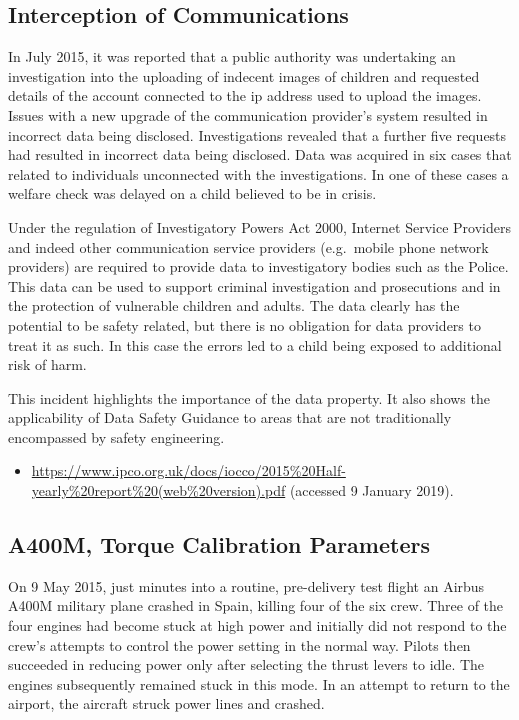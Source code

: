\subsection{Interception of Communications} \label{bkm:incacc:comintercept}
In July 2015, it was reported that a public authority was undertaking an investigation into the uploading of indecent images of children and requested details of the account connected to the \gls{ip} address used to upload the images. Issues with a new upgrade of the communication provider's system resulted in incorrect data being disclosed. Investigations revealed that a further five requests had resulted in incorrect data being disclosed. Data was acquired in six cases that related to individuals unconnected with the investigations. In one of these cases a welfare check was delayed on a child believed to be in crisis.

Under the regulation of Investigatory Powers Act 2000, Internet Service Providers and indeed other communication service providers (e.g.\ mobile phone network providers) are required to provide data to investigatory bodies such as the Police. This data can be used to support criminal investigation and prosecutions and in the protection of vulnerable children and adults. The data clearly has the potential to be safety related, but there is no obligation for data providers to treat it as such. In this case the \glspl{error} led to a child being exposed to additional risk of harm.

This incident highlights the importance of the  \gls{data property}. It also shows the applicability of Data Safety Guidance to areas that are not traditionally encompassed by safety engineering.

\begin{samepage}
\begin{itemize}
  \item \raggedright{\href{https://www.ipco.org.uk/docs/iocco/2015\%20Half-yearly\%20report\%20(web\%20version).pdf}{https://www.ipco.org.uk/docs/iocco/2015\%20Half-yearly\%20report\%20(web\%20version).pdf} (accessed 9 January 2019).}
\end{itemize}
\end{samepage}


\subsection{A400M, Torque Calibration Parameters} \label{bkm:incacc:a400m}
On 9 May 2015, just minutes into a routine, pre-delivery test flight an Airbus A400M military plane crashed in Spain, killing four of the six crew. Three of the four engines had become stuck at high power and initially did not respond to the crew's attempts to control the power setting in the normal way. Pilots then succeeded in reducing power only after selecting the thrust levers to idle. The engines subsequently remained stuck in this mode. In an attempt to return to the airport, the aircraft struck power lines and crashed.  

